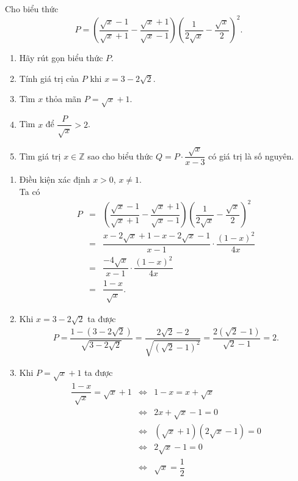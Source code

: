 \begin{bt}%
	Cho biểu thức
	$$P=\left(\dfrac{\sqrt{x}-1}{\sqrt{x}+1} - \dfrac{\sqrt{x}+1}{\sqrt{x}-1}\right) \left(\dfrac{1}{2\sqrt{x}} - \dfrac{\sqrt{x}}{2}\right)^2.$$
	\begin{enumerate}
		\item Hãy rút gọn biểu thức $P$.
		\item Tính giá trị của $P$ khi $x=3-2\sqrt{2}$.
		\item Tìm $x$ thỏa mãn $P=\sqrt{x}+1$.
		\item Tìm $x$ để $\dfrac{P}{\sqrt{x}} > 2$.
		\item Tìm giá trị $x \in \mathbb{Z}$ sao cho biểu thức $Q=P \cdot \dfrac{\sqrt{x}}{x-3}$ có giá trị là số nguyên.
	\end{enumerate}
	\loigiai
	{
		\begin{enumerate}
			\item Điều kiện xác định $x>0$, $x \neq 1$.\\
			Ta có
			\allowdisplaybreaks
			\begin{eqnarray*}
				P &=& \left(\dfrac{\sqrt{x}-1}{\sqrt{x}+1} - \dfrac{\sqrt{x}+1}{\sqrt{x}-1}\right) \left(\dfrac{1}{2\sqrt{x}} - \dfrac{\sqrt{x}}{2}\right)^2\\
				&=& \dfrac{x-2\sqrt{x}+1-x-2\sqrt{x}-1}{x-1} \cdot \dfrac{(1-x)^2}{4x}\\
				&=& \dfrac{-4\sqrt{x}}{x-1} \cdot \dfrac{(1-x)^2}{4x}\\
				&=& \dfrac{1-x}{\sqrt{x}}.
			\end{eqnarray*}
			\item Khi $x=3-2\sqrt{2}$ ta được
			\allowdisplaybreaks
			\begin{eqnarray*}
				P = \dfrac{1-\left(3-2\sqrt{2}\right)}{\sqrt{3-2\sqrt{2}}} = \dfrac{2\sqrt{2}-2}{\sqrt{\left(\sqrt{2}-1\right)^2}} = \dfrac{2\left(\sqrt{2}-1\right)}{\sqrt{2}-1} = 2.
			\end{eqnarray*}
			\item Khi $P=\sqrt{x}+1$ ta được
			\allowdisplaybreaks
			\begin{eqnarray*}
				\dfrac{1-x}{\sqrt{x}} = \sqrt{x}+1 &\Leftrightarrow & 1-x=x+\sqrt{x}\\
				&\Leftrightarrow & 2x+\sqrt{x}-1=0\\
				&\Leftrightarrow & \left(\sqrt{x}+1\right)\left(2\sqrt{x}-1\right)=0\\
				&\Leftrightarrow & 2\sqrt{x}-1=0\\
				&\Leftrightarrow & \sqrt{x}=\dfrac{1}{2}\\

\end{eqnarray*}
\end{enumerate}}
\end{bt}
